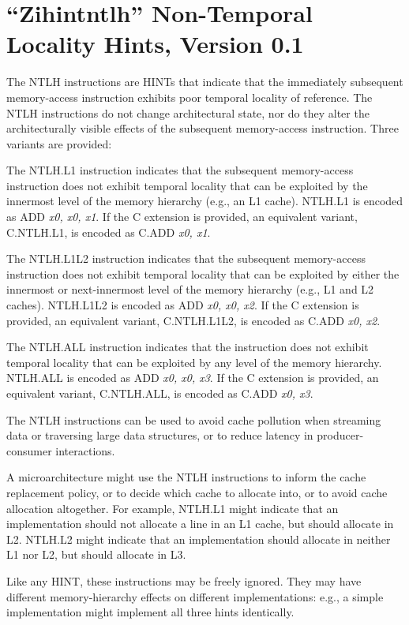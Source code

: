 \chapter{``Zihintntlh'' Non-Temporal Locality Hints, Version 0.1}
\label{chap:zihintpause}

The NTLH instructions are HINTs that indicate that the immediately subsequent
memory-access instruction exhibits poor temporal locality of reference.
The NTLH instructions do not change architectural state, nor do they alter the
architecturally visible effects of the subsequent memory-access instruction.
Three variants are provided:

The NTLH.L1 instruction indicates that the subsequent memory-access
instruction does not exhibit temporal locality that can be exploited by the
innermost level of the memory hierarchy (e.g., an L1 cache).
NTLH.L1 is encoded as ADD {\em x0, x0, x1}.
If the C extension is provided, an equivalent variant, C.NTLH.L1, is encoded
as C.ADD {\em x0, x1}.

The NTLH.L1L2 instruction indicates that the subsequent memory-access
instruction does not exhibit temporal locality that can be exploited by either
the innermost or next-innermost level of the memory hierarchy (e.g., L1 and L2
caches).
NTLH.L1L2 is encoded as ADD {\em x0, x0, x2}.
If the C extension is provided, an equivalent variant, C.NTLH.L1L2, is encoded
as C.ADD {\em x0, x2}.

The NTLH.ALL instruction indicates that the instruction does not exhibit
temporal locality that can be exploited by any level of the memory hierarchy.
NTLH.ALL is encoded as ADD {\em x0, x0, x3}.
If the C extension is provided, an equivalent variant, C.NTLH.ALL, is encoded
as C.ADD {\em x0, x3}.

\begin{commentary}
The NTLH instructions can be used to avoid cache pollution when streaming data
or traversing large data structures, or to reduce latency in producer-consumer
interactions.

A microarchitecture might use the NTLH instructions to inform the cache
replacement policy, or to decide which cache to allocate into, or to avoid
cache allocation altogether.
For example, NTLH.L1 might indicate that an implementation should not allocate
a line in an L1 cache, but should allocate in L2.
NTLH.L2 might indicate that an implementation should allocate in neither L1
nor L2, but should allocate in L3.

Like any HINT, these instructions may be freely ignored.
They may have different memory-hierarchy effects on different implementations:
e.g., a simple implementation might implement all three hints identically.
\end{commentary}

